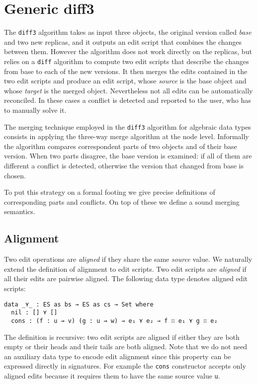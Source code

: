 \documentclass[preprint]{sigplanconf}
\begin{document}
\section{Generic diff3}
	The \texttt{diff3} algorithm takes as input three objects, the original
	version called \emph{base} and two new replicas, and it outputs an
	edit script that combines the changes between them.
	However the algorithm does not work directly on the replicas, but relies
	on a \texttt{diff} algorithm to compute two edit scripts that describe
	the changes from base to each of the new versions.
	It then merges the edits contained in the two edit scripts and produce
	an edit script, whose \emph{source} is the base object and whose 
	\emph{target} is the merged object.
	Nevertheless not all edits can be automatically reconciled.
	In these cases a conflict is detected and reported to the user, who has
	to manually solve it.
		
	The merging technique employed in the \texttt{diff3} algorithm for
	algebraic data types consists in applying the three-way merge algorithm
	at the node level. 
	Informally the algorithm compares correspondent parts 
	of two objects and of their base version.
	When two parts disagree, the base version is examined:
	if all of them are different a conflict is detected, 
        otherwise the version that changed from base is chosen.
	
	To put this strategy on a formal footing we give precise definitions
	of corresponding parts and conflicts.
	On top of these we define a sound merging semantics.

	\subsection{Alignment}
	Two edit operations are \emph{aligned} if they share the same 
	\emph{source} value. We naturally extend the definition of alignment to edit 
	scripts.	Two edit scripts are \emph{aligned} if all their edits are pairwise 
	aligned. The following data type denotes aligned edit scripts:	
\begin{verbatim}
data _⋎_ : ES as bs → ES as cs → Set where
  nil : [] ⋎ []
  cons : (f : u ⇝ v) (g : u ⇝ w) → e₁ ⋎ e₂ → f ∷ e₁ ⋎ g ∷ e₂ 
\end{verbatim}
	The definition is recursive: two edit scripts are aligned if either  
        they are both empty or their heads and their tails are both aligned.
	Note that we do not need an auxiliary data type to encode edit 
	alignment since this property can be expressed directly in signatures.
	For example the \texttt{cons} constructor accepts only aligned edits
	because it requires them to have the same source value \texttt{u}.
	
\end{document}
